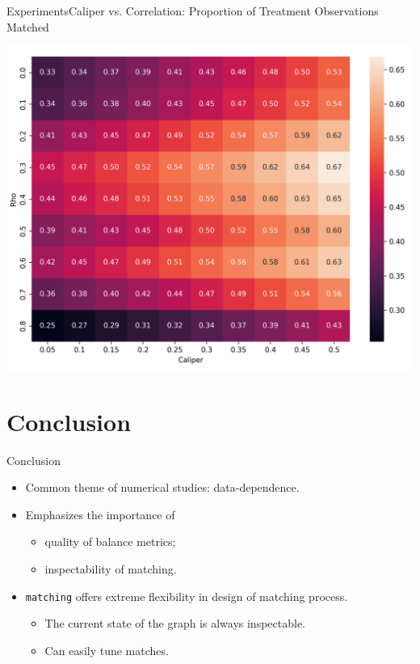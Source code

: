 \documentclass[11pt, compress]{beamer}
\begin{document}
\begin{frame}{Experiments}{Caliper vs. Correlation: Proportion of Treatment Observations Matched}
	\begin{center}
		\includegraphics[width=\textwidth]{../paper/img/output30/caliper_vs_correlation_big/plots/rho_caliper_prop1_match.png}
	\end{center}
\end{frame}

\section{Conclusion}
\begin{frame}{Conclusion}
	\begin{itemize}
		\item Common theme of numerical studies: data-dependence.
		\item Emphasizes the importance of
			\begin{itemize}
				\item quality of balance metrics;
				\item inspectability of matching.
			\end{itemize}
		\item \texttt{matching} offers extreme flexibility in design of matching process.
			\begin{itemize}
				\item The current state of the graph is always inspectable.
				\item Can easily tune matches.
			\end{itemize}
	\end{itemize}
\end{frame}
\end{document}
